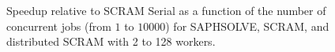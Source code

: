 \begin{figure}[htbp]
  \centering
  
  \caption{Speedup relative to SCRAM Serial as a function of the number of concurrent jobs (from $1$ to $10000$) for SAPHSOLVE, SCRAM, and distributed SCRAM with 2 to 128 workers.}
  \label{fig:speedup}
\end{figure}